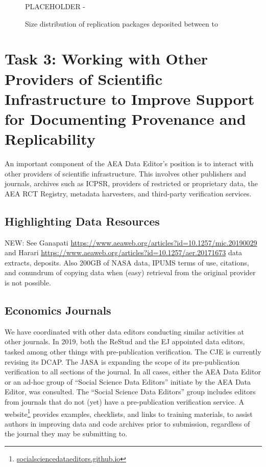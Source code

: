\documentclass[PP]{AEA}
\newcommand{\urlcite}[2]{#2\footnote{\url{#1}}}
\begin{document}

\begin{figure}
    \centering
    PLACEHOLDER - 
    \caption{Size distribution of replication packages deposited between  \firstday{} to \lastday{}}
    \label{fig:size_packages}
\end{figure}



\section{Task 3: Working with Other Providers of Scientific Infrastructure to Improve Support for Documenting Provenance and Replicability}
\label{sec:coordination}

An important component of the AEA Data Editor's position is to interact with other providers of scientific infrastructure. This involves other publishers and journals, archives such as ICPSR, providers of restricted or proprietary data, the AEA RCT Registry, metadata harvesters, and third-party verification services. 

\subsection{Highlighting Data Resources}

NEW: See Ganapati \url{https://www.aeaweb.org/articles?id=10.1257/mic.20190029} and Harari \url{https://www.aeaweb.org/articles?id=10.1257/aer.20171673} data extracts, deposits. Also 200GB of NASA data, IPUMS terms of use, citations, and conundrum of copying data when (easy) retrieval from the original provider is not possible.

\subsection{Economics Journals}

We have coordinated with other data editors conducting similar activities at other journals. In 2019, both the \ac{ReStud} and the \ac{EJ}  appointed data editors, tasked among other things with pre-publication verification. The \ac{CJE} is currently revising its \ac{DCAP}. The \ac{JASA} is expanding the scope of its pre-publication verification to all sections of the journal. In all cases, either the AEA Data Editor or an ad-hoc group of ``Social Science Data Editors'' initiate by the AEA Data Editor, was consulted. The ``Social Science Data Editors'' group includes  editors from journals that do not (yet) have a pre-publication verification service. A  \urlcite{socialsciencedataeditors.github.io}{website} provides examples, checklists, and links to training materials, to assist authors in  improving data and code archives prior to submission, regardless of the journal they may be submitting to.
\end{document}

